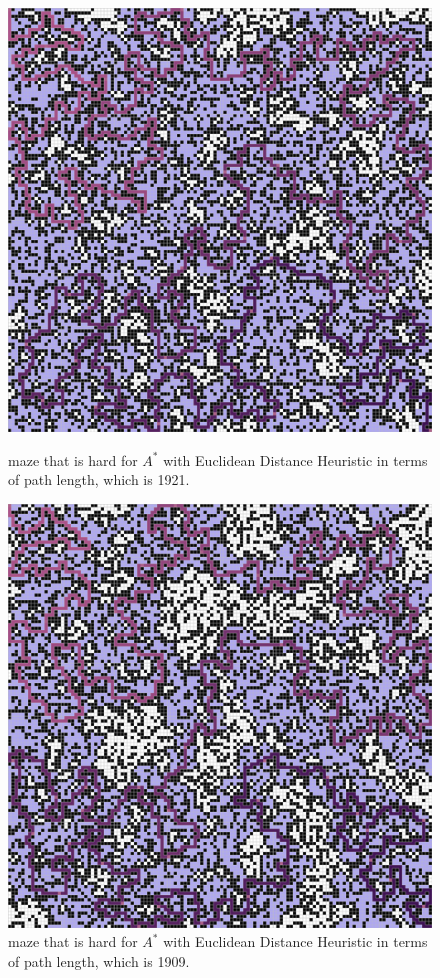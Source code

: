 \documentclass[letter]{article}
\begin{document}
\begin{enumerate}[resume]
\begin{enumerate}
\begin{enumerate}
\begin{figure}
					\includegraphics[width=\textwidth]{../pics/aep/1921.png}
					\caption{\label{fig:aep2}maze that is hard for $ A^* $ with Euclidean Distance Heuristic in terms of path length, which is 1921.}
					\endminipage\hfill
					\includegraphics[width=\textwidth]{../pics/aep/1909.png}
					\caption{\label{fig:aep3}maze that is hard for $ A^* $ with Euclidean Distance Heuristic in terms of path length, which is 1909.}
					\endminipage
					\endminipage
					

\end{figure}
\end{enumerate}
\end{enumerate}
\end{enumerate}
\end{document}
